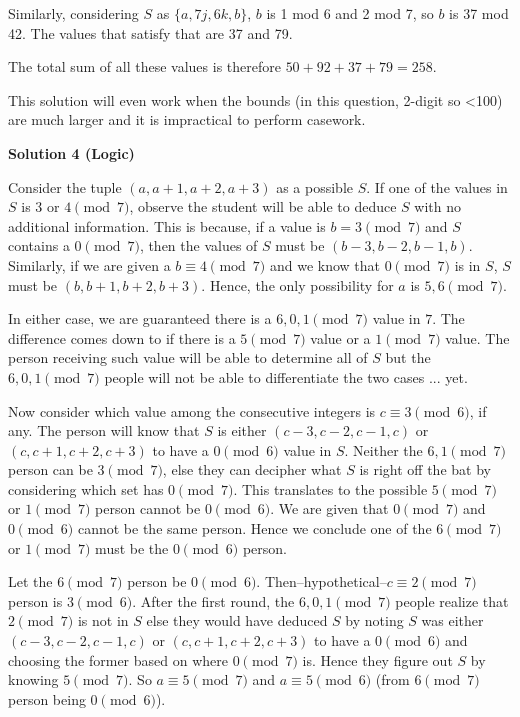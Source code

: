 \begin{enumerate}
 Similarly, considering $S$ as $\{a,7j,6k,b\}$, $b$ is 1 mod 6 and 2 mod 7, so $b$ is 37 mod 42. The values that satisfy that are 37 and 79. 

 The total sum of all these values is therefore $50+92+37+79=\boxed{258}$.

 This solution will even work when the bounds (in this question, 2-digit so <100) are much larger and it is impractical to perform casework.

 



\textbf{Solution 4 (Logic)}

Consider the tuple $(a, a+1, a+2, a+3)$ as a possible $S$. If one of the values in $S$ is $3$ or $4 \pmod{7}$, observe the student will be able to deduce $S$ with no additional information. This is because, if a value is $b = 3 \pmod{7}$ and $S$ contains a $0 \pmod{7}$, then the values of $S$ must be $(b-3, b-2, b-1, b)$. Similarly, if we are given a $b \equiv 4 \pmod{7}$ and we know that $0 \pmod{7}$ is in $S$, $S$ must be $(b, b+1, b+2, b+3).$ Hence, the only possibility for $a$ is $5, 6 \pmod{7}.$

 In either case, we are guaranteed there is a $6, 0, 1 \pmod{7}$ value in $7$. The difference comes down to if there is a $5 \pmod{7}$ value or a $1 \pmod{7}$ value. The person receiving such value will be able to determine all of $S$ but the $6, 0, 1 \pmod{7}$ people will not be able to differentiate the two cases ... yet.

 Now consider which value among the consecutive integers is $c \equiv 3 \pmod{6}$, if any. The person will know that $S$ is either $(c-3, c-2, c-1, c)$ or $(c, c+1, c+2, c+3)$ to have a $0 \pmod{6}$ value in $S$. Neither the $6, 1 \pmod{7}$ person can be $3 \pmod{7}$, else they can decipher what $S$ is right off the bat by considering which set has $0 \pmod{7}.$ This translates to the possible $5 \pmod{7}$ or $1 \pmod{7}$ person cannot be $0 \pmod{6}$. We are given that $0 \pmod{7}$ and $0 \pmod{6}$ cannot be the same person. Hence we conclude one of the $6 \pmod{7}$ or $1 \pmod{7}$ must be the $0 \pmod{6}$ person.

 Let the $6 \pmod{7}$ person be $0 \pmod{6}.$ Then--hypothetical--$c \equiv 2 \pmod{7}$ person is $3 \pmod{6}.$ After the first round, the $6, 0, 1 \pmod{7}$ people realize that $2 \pmod{7}$ is not in $S$ else they would have deduced $S$ by noting $S$ was either $(c-3, c-2, c-1, c)$ or $(c, c+1, c+2, c+3)$ to have a $0 \pmod{6}$ and choosing the former based on where $0 \pmod{7}$ is. Hence they figure out $S$ by knowing $5 \pmod{7}.$ So $a \equiv 5 \pmod{7}$ and $a \equiv 5 \pmod{6}$ (from $6 \pmod{7}$ person being $0 \pmod{6}$).


\end{enumerate}
